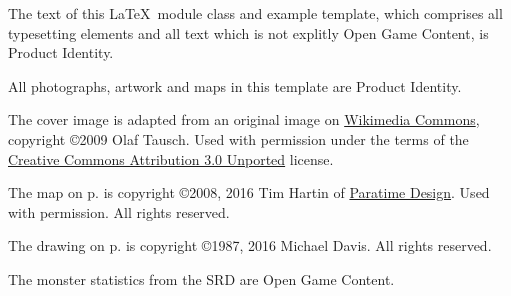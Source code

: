 \documentclass[letterpaper,serif]{module}
\begin{document}
\begin{productidentity}
\item The text of this \LaTeX~module class and example template, which comprises all typesetting elements and all text which
is not explitly Open Game Content, is Product Identity.
\modulecopyright

\item All photographs, artwork and maps in this template are Product Identity.

\item The cover image is adapted from an original image on
\href{https://commons.wikimedia.org/wiki/File:Karnak_Tempel_Vorhof_05.jpg}{Wikimedia Commons}, copyright \copyright 2009 Olaf
Tausch. Used with permission under the terms of the
\href{https://creativecommons.org/licenses/by/3.0/deed.en}{Creative Commons Attribution 3.0 Unported} license.

\item The map on p.\pageref{img:map} is copyright \copyright 2008, 2016 Tim Hartin of \href{http://paratime.ca}{Paratime Design}.
Used with permission. All rights reserved.

\item The drawing on p.\pageref{img:tomb} is copyright \copyright 1987, 2016 Michael Davis. All rights reserved.
\end{productidentity}

\begin{opengamecontent}
\item The monster statistics from the SRD are Open Game Content.
\end{opengamecontent}

%
%

\tableofcontents

\end{document}
